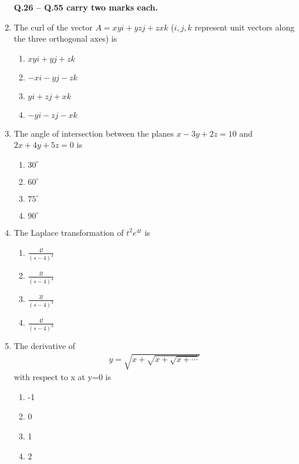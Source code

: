 \documentclass[journal]{IEEEtran}
\numberwithin{equation}{enumi}
\numberwithin{figure}{enumi}
\begin{document}
\begin{enumerate}
\textbf{Q.26 -- Q.55 carry two marks each.}

\vspace{0.5cm}
    \item The curl of the vector $A = xyi + yzj + zxk$ ($i, j, k$ represent unit vectors along the three orthogonal axes) is
     \hfill{}
\begin{multicols}{4}
    \begin{enumerate}
    \item $xyi + yj + zk$
    \item $-xi - yj - zk$
    \item $yi + zj + xk$
    \item  $-yi - zj - xk$
    \end{enumerate}
    \end{multicols}
      
  

    \item The angle of intersection between the planes $x - 3y + 2z = 10$ and $2x + 4y + 5z = 0$ is
    \hfill{}
\begin{multicols}{4}
    \begin{enumerate}
    \item $30^\circ$
    \item $60^\circ$
    \item $75^\circ$
    \item $90^\circ$
    \end{enumerate}
    \end{multicols}
      

       
    \item The Laplace transformation of $t^2 e^{4t}$ is
    \hfill{}
\begin{multicols}{4}
    \begin{enumerate}
    \item $\frac{4!}{(s-4)^4}$
    \item $\frac{3!}{(s-4)^4}$
    \item $\frac{3!}{(s-4)^3}$
    \item $\frac{4!}{(s-4)^3}$
    \end{enumerate}
    \end{multicols}
  

    
    \item The derivative of 
    \begin{align*}
        y = \sqrt{x + \sqrt{x + \sqrt{x + \cdots}}}
    \end{align*}
        with respect to x at y=0 is
    \hfill{}
\begin{multicols}{4}
    \begin{enumerate}
    \item -1
    \item 0
    \item 1
    \item 2
    \end{enumerate}
    \end{multicols}
  



\end{enumerate}
\end{document}
